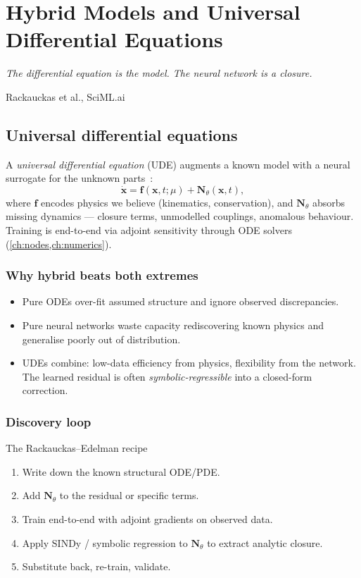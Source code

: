 \chapter{Hybrid Models and Universal Differential Equations}
\label{ch:hybrid-ude}

\epigraph{\itshape The differential equation is the model. The neural
network is a closure.}{Rackauckas et al., SciML.ai}

\section{Universal differential equations}
A \emph{universal differential equation} (UDE) augments a known model
with a neural surrogate for the unknown
parts~\cite{rackauckas2020ude}:
\begin{equation}
\dot{\bm{x}} = \bm{f}(\bm{x},t;\mu) + \bm{N}_\theta(\bm{x},t),
\end{equation}
where $\bm{f}$ encodes physics we believe (kinematics, conservation),
and $\bm{N}_\theta$ absorbs missing dynamics --- closure terms,
unmodelled couplings, anomalous behaviour. Training is end-to-end via
adjoint sensitivity through ODE solvers
(\cref{ch:nodes,ch:numerics}).

\subsection{Why hybrid beats both extremes}
\begin{itemize}
\item Pure ODEs over-fit assumed structure and ignore observed
discrepancies.
\item Pure neural networks waste capacity rediscovering known physics
and generalise poorly out of distribution.
\item UDEs combine: low-data efficiency from physics, flexibility from
the network. The learned residual is often \emph{symbolic-regressible}
into a closed-form correction.
\end{itemize}

\subsection{Discovery loop}
\begin{recipe}{The Rackauckas--Edelman recipe}
\begin{enumerate}
\item Write down the known structural ODE/PDE.
\item Add $\bm{N}_\theta$ to the residual or specific terms.
\item Train end-to-end with adjoint gradients on observed data.
\item Apply SINDy / symbolic regression to $\bm{N}_\theta$ to extract
analytic closure.
\item Substitute back, re-train, validate.
\end{enumerate}
\end{recipe}

